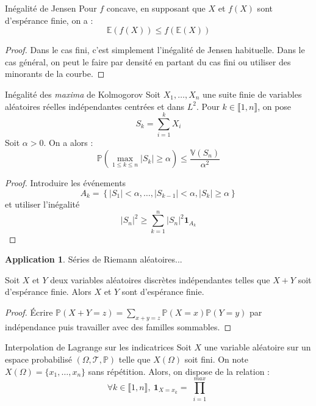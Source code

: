 \documentclass[french]{article}
\renewcommand{\P}{\mathbb{P}}
\newcommand{\E}{\mathbb{E}}
\newcommand{\V}{\mathbb{V}}
\theoremstyle{theorem}
\theoremstyle{definition}
\newtheorem*{app}{Application}
\begin{document}
\begin{lem}{Inégalité de Jensen}
	Pour $f$ concave, en supposant que $X$ et $f(X)$ sont d'espérance finie, on a : $$\E(f(X))\leqslant f(\E(X))$$
\end{lem}
\begin{proof}
	Dans le cas fini, c'est simplement l'inégalité de Jensen habituelle. Dans le cas général, on peut le faire par densité en partant du cas fini ou utiliser des minorants de la courbe. 
\end{proof}

\begin{lem}{Inégalité des \textit{maxima} de Kolmogorov}
	Soit $X_1,\ldots,X_n$ une suite finie de variables aléatoires réelles indépendantes centrées et dans $L^2$. Pour $k\in\llbracket1,n\rrbracket$, on pose $$S_k=\sum_{i=1}^{k}X_i$$ Soit $\alpha>0$. On a alors : $$\P\left(\underset{1\leqslant k\leqslant n}{\max}\lvert S_k\rvert\geqslant\alpha\right)\leqslant\frac{\V(S_n)}{\alpha^2}$$
\end{lem}
\begin{proof}
	Introduire les événements $$A_k=\left\{\lvert S_1\rvert <\alpha,\ldots,\lvert S_{k-1}\rvert<\alpha,\lvert S_k\rvert\geqslant\alpha\right\}$$ et utiliser l'inégalité $$\lvert S_n\rvert^2\geqslant\sum_{k=1}^{n}\lvert S_n\rvert^2\mathbf{1}_{A_k}$$
\end{proof}
\begin{app}
	Séries de Riemann aléatoires...
\end{app}

\begin{lem}{}
	Soit $X$ et $Y$ deux variables aléatoires discrètes indépendantes telles que $X+Y$ soit d'espérance finie. Alors $X$ et $Y$ sont d'espérance finie.
\end{lem}
\begin{proof}
	Écrire $\P(X+Y=z)=\displaystyle\sum_{x+y=z}\P(X=x)\P(Y=y)$ par indépendance puis travailler avec des familles sommables.
\end{proof}

\begin{lem}{Interpolation de Lagrange sur les indicatrices}
	Soit $X$ une variable aléatoire sur un espace probabilisé $(\Omega,\mathcal{T},\P)$ telle que $X(\Omega)$ soit fini. On note $X(\Omega)=\{x_1,\ldots,x_n\}$ sans répétition. Alors, on dispose de la relation : $$\forall k\in\llbracket1,n\rrbracket,\ \mathbf{1}_{X=x_k}=\prod_{\substack{i=1\\}}^{max}$$
\end{lem}
\end{document}
